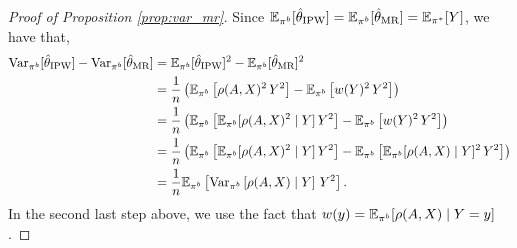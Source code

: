 \begin{proof}[Proof of Proposition \ref{prop:var_mr}]
Since $\mathbb{E}_{\pi^b}[\hat{\theta}_{\textup{IPW}}] = \mathbb{E}_{\pi^b}[\hat{\theta}_{\textup{MR}}] = \mathbb{E}_{\pi^*}[Y]$, we have that,  
\begin{align*}
    \textup{Var}_{\pi^b}[\hat{\theta}_{\textup{IPW}}] - \textup{Var}_{\pi^b}[\hat{\theta}_{\textup{MR}}] &= \mathbb{E}_{\pi^b}[\hat{\theta}_{\textup{IPW}}]^2 - \mathbb{E}_{\pi^b}[\hat{\theta}_{\textup{MR}}]^2 \\
    &= \frac{1}{n} \left(\mathbb{E}_{\pi^b}\left[\rho(A, X)^2\, Y^2 \right] - \mathbb{E}_{\pi^b}\left[w(Y)^2\, Y^2 \right] \right)\\
    &= \frac{1}{n} \left(\mathbb{E}_{\pi^b}\left[\mathbb{E}_{\pi^b}[\rho(A, X)^2\mid Y]\, Y^2 \right] - \mathbb{E}_{\pi^b}\left[w(Y)^2\, Y^2 \right] \right)\\
    &= \frac{1}{n} \left(\mathbb{E}_{\pi^b}\left[\mathbb{E}_{\pi^b}[\rho(A, X)^2\mid Y]\, Y^2 \right] - \mathbb{E}_{\pi^b}\left[\mathbb{E}_{\pi^b}[\rho(A, X)\mid Y]^2\, Y^2 \right] \right)\\
    &= \frac{1}{n} \mathbb{E}_{\pi^b} \left[ \textup{Var}_{\pi^b}\left[ \rho(A, X) \mid Y \right]\, Y^2 \right].
\end{align*}
In the second last step above, we use the fact that $w(y) = \mathbb{E}_{\pi^b}[\rho(A, X)\mid Y=y]$. 
\end{proof}

